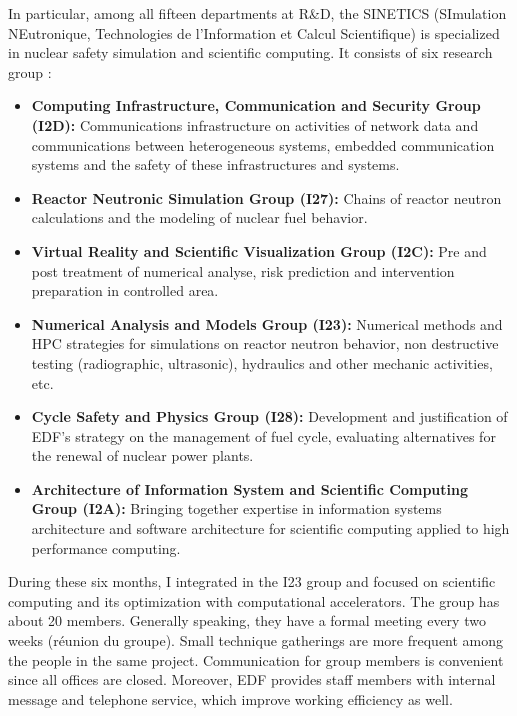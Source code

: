 In particular, among all fifteen departments at R\&D, the SINETICS (SImulation NEutronique, Technologies de l’Information et Calcul Scientifique) is specialized in nuclear safety simulation and scientific computing. It consists of six research group \citep{sinetics}:
\begin{itemize}
  \it
  \item \textbf{Computing Infrastructure, Communication and Security Group (I2D): }Communications infrastructure on activities of network data and communications between heterogeneous systems, embedded communication systems and the safety of these infrastructures and systems.
  \item \textbf{Reactor Neutronic Simulation Group (I27):} Chains of reactor neutron calculations and the modeling of nuclear fuel behavior.
  \item \textbf{Virtual Reality and Scientific Visualization Group (I2C):} Pre and post treatment of numerical analyse, risk prediction and intervention preparation in controlled area.
	\item \textbf{Numerical Analysis and Models Group (I23):} Numerical methods and HPC strategies  for simulations on reactor neutron behavior, non destructive testing (radiographic, ultrasonic), hydraulics and other mechanic activities, etc.
	\item \textbf{Cycle Safety and Physics Group (I28):} Development and justification of EDF's strategy on the management of fuel cycle, evaluating alternatives for the renewal of nuclear power plants.
	\item \textbf{Architecture of Information System and Scientific Computing Group (I2A):} Bringing together expertise in information systems architecture and software architecture for scientific computing applied to high performance computing.
\end{itemize}
During these six months, I integrated in the I23 group and focused on scientific computing and its optimization with computational accelerators. The group has about 20 members. Generally speaking, they have a formal meeting every two weeks (réunion du groupe). Small technique gatherings are more frequent among the people in the same project. Communication for group members is convenient since all offices are closed. Moreover, EDF provides staff members with internal message and telephone service, which improve working efficiency as well.

